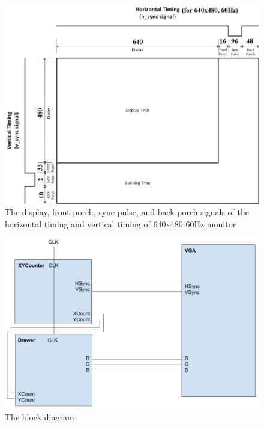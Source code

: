 \documentclass[12pt]{article}
\numberwithin{figure}{section}
\begin{document}
\begin{figure}[ht]
  \centering
  \includegraphics[width=\textwidth]{vga_timing_sequence_640x480_60hz.png}
  \caption{The display, front porch, sync pulse, and back porch signals of the horizontal timing and vertical timing of 640x480 60Hz monitor}
  \label{fig:640x480_60hz_vga_timing_sequence}
\end{figure}

\begin{figure}[ht]
  \centering
  \includegraphics[width=\textwidth]{lab6_block_diagram.png}
  \caption{The block diagram}
  \label{fig:block_diagram}
\end{figure}

\end{document}
